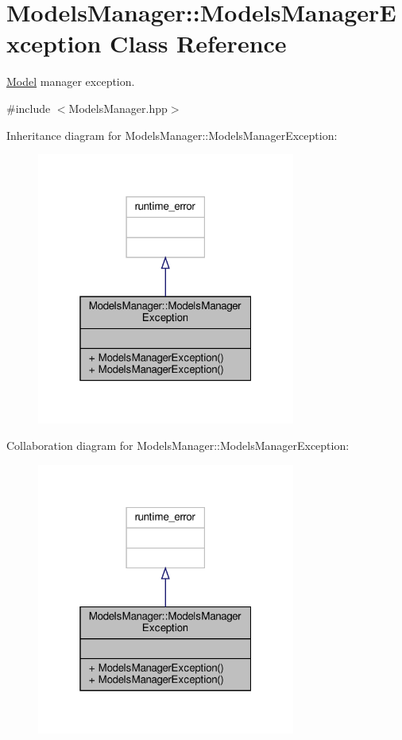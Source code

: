 \hypertarget{class_models_manager_1_1_models_manager_exception}{}\section{Models\+Manager\+:\+:Models\+Manager\+Exception Class Reference}
\label{class_models_manager_1_1_models_manager_exception}


\hyperlink{class_model}{Model} manager exception.  




{\ttfamily \#include $<$Models\+Manager.\+hpp$>$}



Inheritance diagram for Models\+Manager\+:\+:Models\+Manager\+Exception\+:
\nopagebreak
\begin{figure}[H]
\begin{center}
\leavevmode
\includegraphics[width=241pt]{class_models_manager_1_1_models_manager_exception__inherit__graph}
\end{center}
\end{figure}


Collaboration diagram for Models\+Manager\+:\+:Models\+Manager\+Exception\+:
\nopagebreak
\begin{figure}[H]
\begin{center}
\leavevmode
\includegraphics[width=241pt]{class_models_manager_1_1_models_manager_exception__coll__graph}
\end{center}
\end{figure}
